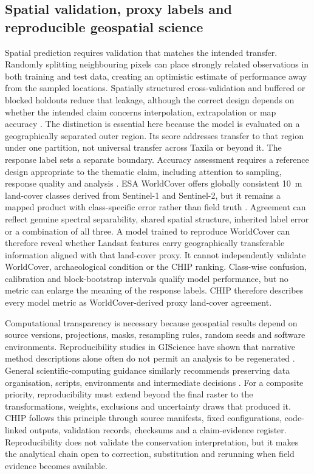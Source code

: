 \subsection{Spatial validation, proxy labels and reproducible geospatial science}

Spatial prediction requires validation that matches the intended transfer. Randomly splitting neighbouring pixels can place strongly related observations in both training and test data, creating an optimistic estimate of performance away from the sampled locations. Spatially structured cross-validation and buffered or blocked holdouts reduce that leakage, although the correct design depends on whether the intended claim concerns interpolation, extrapolation or map accuracy \citep{roberts2017cv,valavi2019blockcv,ploton2020spatial,wadoux2021spatial}. The distinction is essential here because the model is evaluated on a geographically separated outer region. Its score addresses transfer to that region under one partition, not universal transfer across Taxila or beyond it. The response label sets a separate boundary. Accuracy assessment requires a reference design appropriate to the thematic claim, including attention to sampling, response quality and analysis \citep{olofsson2014accuracy,stehman2019accuracy}. ESA WorldCover offers globally consistent 10~m land-cover classes derived from Sentinel-1 and Sentinel-2, but it remains a mapped product with class-specific error rather than field truth \citep{zanaga2021worldcover,esa_worldcover}. Agreement can reflect genuine spectral separability, shared spatial structure, inherited label error or a combination of all three. A model trained to reproduce WorldCover can therefore reveal whether Landsat features carry geographically transferable information aligned with that land-cover proxy. It cannot independently validate WorldCover, archaeological condition or the CHIP ranking. Class-wise confusion, calibration and block-bootstrap intervals qualify model performance, but no metric can enlarge the meaning of the response labels. CHIP therefore describes every model metric as WorldCover-derived proxy land-cover agreement.

Computational transparency is necessary because geospatial results depend on source versions, projections, masks, resampling rules, random seeds and software environments. Reproducibility studies in GIScience have shown that narrative method descriptions alone often do not permit an analysis to be regenerated \citep{nust2018reproducible}. General scientific-computing guidance similarly recommends preserving data organisation, scripts, environments and intermediate decisions \citep{peng2011reproducible,stodden2016enhancing,wilson2017practices}. For a composite priority, reproducibility must extend beyond the final raster to the transformations, weights, exclusions and uncertainty draws that produced it. CHIP follows this principle through source manifests, fixed configurations, code-linked outputs, validation records, checksums and a claim-evidence register. Reproducibility does not validate the conservation interpretation, but it makes the analytical chain open to correction, substitution and rerunning when field evidence becomes available.

